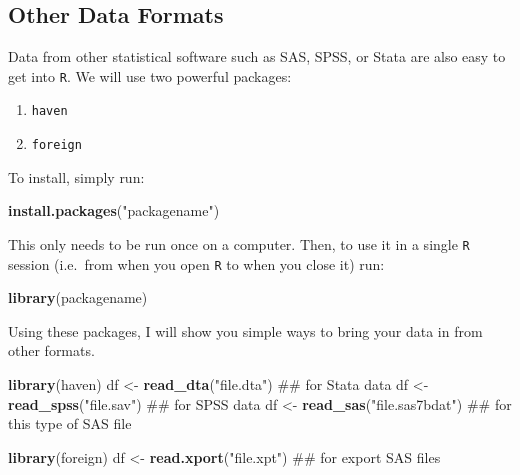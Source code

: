 \documentclass[]{tufte-book}
\newenvironment{Shaded}{}{}
\newcommand{\KeywordTok}[1]{\textcolor[rgb]{0.00,0.44,0.13}{\textbf{#1}}}
\newcommand{\StringTok}[1]{\textcolor[rgb]{0.25,0.44,0.63}{#1}}
\newcommand{\NormalTok}[1]{#1}
\providecommand{\tightlist}{%
  \setlength{\itemsep}{0pt}\setlength{\parskip}{0pt}}
\theoremstyle{definition}
\theoremstyle{definition}
\theoremstyle{remark}
\begin{document}
\subsection*{Other Data Formats}\label{other-data-formats}

Data from other statistical software such as SAS, SPSS, or Stata are
also easy to get into \texttt{R}. We will use two powerful packages:

\begin{enumerate}
\def\labelenumi{\arabic{enumi}.}
\tightlist
\item
  \texttt{haven}
\item
  \texttt{foreign}
\end{enumerate}

To install, simply run:

\begin{Shaded}
\begin{Highlighting}[]
\KeywordTok{install.packages}\NormalTok{(}\StringTok{"packagename"}\NormalTok{)}
\end{Highlighting}
\end{Shaded}

This only needs to be run once on a computer. Then, to use it in a
single \texttt{R} session (i.e.~from when you open \texttt{R} to when
you close it) run:

\begin{Shaded}
\begin{Highlighting}[]
\KeywordTok{library}\NormalTok{(packagename)}
\end{Highlighting}
\end{Shaded}

Using these packages, I will show you simple ways to bring your data in
from other formats.

\begin{Shaded}
\begin{Highlighting}[]
\KeywordTok{library}\NormalTok{(haven)}
\NormalTok{df <-}\StringTok{ }\KeywordTok{read_dta}\NormalTok{(}\StringTok{"file.dta"}\NormalTok{)  ## for Stata data}
\NormalTok{df <-}\StringTok{ }\KeywordTok{read_spss}\NormalTok{(}\StringTok{"file.sav"}\NormalTok{)  ## for SPSS data}
\NormalTok{df <-}\StringTok{ }\KeywordTok{read_sas}\NormalTok{(}\StringTok{"file.sas7bdat"}\NormalTok{)  ## for this type of SAS file}
\end{Highlighting}
\end{Shaded}

\begin{Shaded}
\begin{Highlighting}[]
\KeywordTok{library}\NormalTok{(foreign)}
\NormalTok{df <-}\StringTok{ }\KeywordTok{read.xport}\NormalTok{(}\StringTok{"file.xpt"}\NormalTok{)  ## for export SAS files}
\end{Highlighting}
\end{Shaded}
\end{document}
